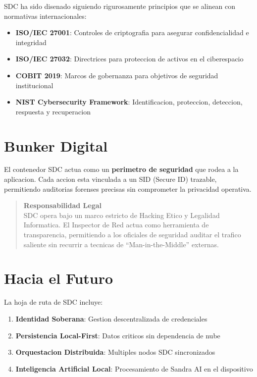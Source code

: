 SDC ha sido disenado siguiendo rigurosamente principios que se alinean con normativas internacionales:

\begin{itemize}[leftmargin=*]
    \item \textbf{ISO/IEC 27001}: Controles de criptografia para asegurar confidencialidad e integridad
    \item \textbf{ISO/IEC 27032}: Directrices para proteccion de activos en el ciberespacio
    \item \textbf{COBIT 2019}: Marcos de gobernanza para objetivos de seguridad institucional
    \item \textbf{NIST Cybersecurity Framework}: Identificacion, proteccion, deteccion, respuesta y recuperacion
\end{itemize}

\section*{Bunker Digital}

El contenedor SDC actua como un \textbf{perimetro de seguridad} que rodea a la aplicacion. Cada accion esta vinculada a un SID (Secure ID) trazable, permitiendo auditorias forenses precisas sin comprometer la privacidad operativa.

\begin{quote}
\textbf{Responsabilidad Legal}\\
\small
SDC opera bajo un marco estricto de Hacking Etico y Legalidad Informatica. El Inspector de Red actua como herramienta de transparencia, permitiendo a los oficiales de seguridad auditar el trafico saliente sin recurrir a tecnicas de ``Man-in-the-Middle'' externas.
\end{quote}

\section*{Hacia el Futuro}

La hoja de ruta de SDC incluye:

\begin{enumerate}[leftmargin=*]
    \item \textbf{Identidad Soberana}: Gestion descentralizada de credenciales
    \item \textbf{Persistencia Local-First}: Datos criticos sin dependencia de nube
    \item \textbf{Orquestacion Distribuida}: Multiples nodos SDC sincronizados
    \item \textbf{Inteligencia Artificial Local}: Procesamiento de Sandra AI en el dispositivo
\end{enumerate}

\vspace{1cm}
\begin{center}
\end{center}
